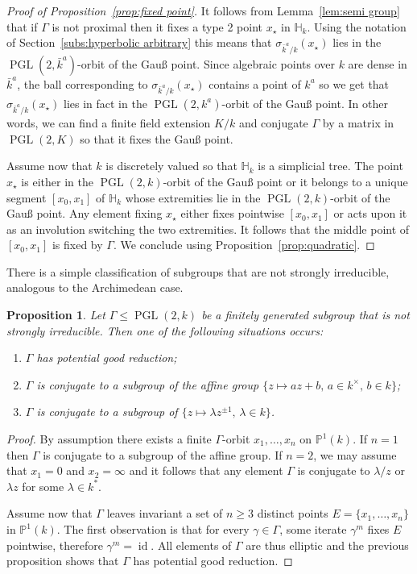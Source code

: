 \documentclass[11pt]{article}
\newtheorem{prop}[theo]{Proposition}
\theoremstyle{definition}
\numberwithin{equation}{section}
\numberwithin{figure}{section}
\numberwithin{table}{section}
\DeclareMathOperator{\id}{id}
\DeclareMathOperator{\PGL}{PGL}
\newcommand{\pp}{\mathbb{P}}
\newcommand{\hh}{\mathbb{H}}
\newcommand{\PGLk}{\PGL(2, k)}
\begin{document}
\begin{proof}[Proof of Proposition~\ref{prop:fixed point}]
It follows from Lemma~\ref{lem:semi group} that if $\Gamma$ is not proximal then it fixes a type 2 point $x_\star$ in $\hh_k$. Using the notation of Section~\ref{subs:hyperbolic arbitrary} this means that $\sigma_{\bar{k}^a/k}(x_\star)$ lies in the $\PGL(2,\bar{k}^a)$-orbit of the Gau\ss{} point. Since algebraic points over $k$ are dense in $\bar{k}^a$, the ball corresponding to $\sigma_{\bar{k}^a/k}(x_\star)$ contains a point of $k^a$ so we get that $\sigma_{\bar{k}^a/k}(x_\star)$ lies in fact in the $\PGL(2,k^a)$-orbit of the Gau\ss{} point. In other words, we can find a finite field extension $K/k$ and conjugate $\Gamma$ by a matrix in $\PGL(2,K)$ so that it fixes the Gau\ss{} point.

Assume now that $k$ is discretely valued so that $\hh_k$ is a simplicial tree. The point $x_\star$ is either in the $\PGL(2,k)$-orbit of the Gau\ss{} point or it belongs to a unique segment $[x_0,x_1]$ of $\hh_k$ whose extremities lie in the $\PGL(2,k)$-orbit of the Gau\ss{} point. Any element fixing $x_\star$ either fixes pointwise $[x_0,x_1]$ or acts upon it as an involution switching the two extremities. It follows that the middle point of $[x_0,x_1]$ is fixed by $\Gamma$. We conclude using Proposition~\ref{prop:quadratic}.
\end{proof}


There is a simple classification of subgroups that are not strongly irreducible, analogous to the Archimedean case.

\begin{prop}\label{prop:strongly irreducible}
Let $\Gamma\leq \PGLk$ be a finitely generated subgroup that is not strongly irreducible. Then one of the following situations occurs:
\begin{enumerate}
\item $\Gamma$ has potential good reduction;
\item $\Gamma$ is conjugate to a subgroup of the affine group $\{z\mapsto a z + b, \, a \in k^\times, \, b\in k\}$;
\item $\Gamma$ is conjugate to a subgroup of $\{z\mapsto \lambda z^{\pm 1},\, \lambda \in k\}$.
\end{enumerate}
\end{prop}

\begin{proof}
By assumption there exists a finite $\Gamma$-orbit $x_1, \ldots, x_n$ on $\pp^1(k)$. If $n=1$ then $\Gamma$ is conjugate to a subgroup of the affine group. If $n=2$, we may assume that $x_1 =0$ and $x_2 =\infty$ and it follows that any element $\Gamma$ is conjugate to $\lambda /z$ or $\lambda z$ for some $\lambda\in k^*$.

Assume now that $\Gamma$ leaves invariant a set of $n\ge3$ distinct points $E= \{ x_1, \ldots, x_n \}$ in $\pp^1(k)$. The first observation is that for every $\gamma\in \Gamma$, some iterate $\gamma^m$ fixes $E$ pointwise, therefore $\gamma^m = \id$. All elements of $\Gamma$ are thus elliptic and the previous proposition shows that $\Gamma$ has potential good reduction.
\end{proof}
\end{document}

